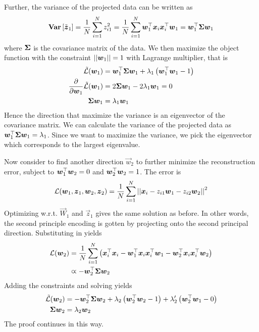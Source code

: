 Further, the variance of the projected data can be written as
\begin{align*}
	\mathbf{Var}\left[\tilde{\boldsymbol{z}}_1\right]=\frac{1}{N}\sum_{i=1}^Nz_{i1}^2=\frac{1}{N}\sum_{i=1}^N\boldsymbol{w}_1^\top\boldsymbol{x}_i\boldsymbol{x}_i^\top\boldsymbol{w}_1=\boldsymbol{w}_1^\top\mathbf{\Sigma}\boldsymbol{w}_1
\end{align*}
where $\mathbf{\Sigma}$ is the covariance matrix of the data. We then maximize the object function with the constraint $\left\vert\left\vert \boldsymbol{w}_1 \right\vert\right\vert=1$ with Lagrange multiplier, that is
\begin{align*}
	\tilde{\mathcal{L}}(\boldsymbol{w}_1)&=\boldsymbol{w}_1^\top\mathbf{\Sigma}\boldsymbol{w}_1+\lambda_1\left(\boldsymbol{w}_1^\top\boldsymbol{w}_1-1\right) \\
	\frac{\partial}{\partial\boldsymbol{w}_1}\tilde{\mathcal{L}}(\boldsymbol{w}_1)&=2\mathbf{\Sigma}\boldsymbol{w}_1-2\lambda_1\boldsymbol{w}_1=0 \\
	\mathbf{\Sigma}\boldsymbol{w}_1&=\lambda_1\boldsymbol{w}_1
\end{align*}
Hence the direction that maximize the variance is an eigenvector of the covariance matrix. We can calculate the variance of the projected data as $\boldsymbol{w}_1^\top\mathbf{\Sigma}\boldsymbol{w}_1=\lambda_1$. Since we want to maximize the variance, we pick the eigenvector which corresponds to the largest eigenvalue.

Now consider to find another direction $\vec{w}_2$ to further minimize the reconstruction error, subject to $\boldsymbol{w}_1^\top\boldsymbol{w}_2=0$ and $\boldsymbol{w}_2^\top\boldsymbol{w}_2=1$. The error is
\begin{align*}
	\mathcal{L}(\boldsymbol{w}_1,\boldsymbol{z}_1,\boldsymbol{w}_2,\boldsymbol{z}_2)=\frac{1}{N}\sum_{i=1}^N\left\vert\left\vert \boldsymbol{x}_i-z_{i1}\boldsymbol{w}_1-z_{i2}\boldsymbol{w}_2 \right\vert\right\vert^2
\end{align*}
Optimizing w.r.t. $\vec{W}_1$ and $\vec{z}_1$ gives the same solution as before. In other words, the second principle encoding is gotten by projecting onto the second principal direction. Substituting in yields
\begin{align*}
	\mathcal{L}(\boldsymbol{w}_2)&=\frac{1}{N}\sum_{i=1}^N\left(\boldsymbol{x}_i^\top\boldsymbol{x}_i-\boldsymbol{w}_1^\top\boldsymbol{x}_i\boldsymbol{x}_i^\top\boldsymbol{w}_1-\boldsymbol{w}_2^\top\boldsymbol{x}_i\boldsymbol{x}_i^\top\boldsymbol{w}_2\right) \\
	&\varpropto-\boldsymbol{w}_2^\top\mathbf{\Sigma}\boldsymbol{w}_2
\end{align*}
Adding the constraints and solving yields
\begin{align*}
	\tilde{\mathcal{L}}(\boldsymbol{w}_2)&=-\boldsymbol{w}_2^\top\mathbf{\Sigma}\boldsymbol{w}_2+\lambda_2\left(\boldsymbol{w}_2^\top\boldsymbol{w}_2-1\right)+\lambda_2'\left(\boldsymbol{w}_2^\top\boldsymbol{w}_1-0\right) \\
	\mathbf{\Sigma}\boldsymbol{w}_2&=\lambda_2\boldsymbol{w}_2
\end{align*}
The proof continues in this way.

